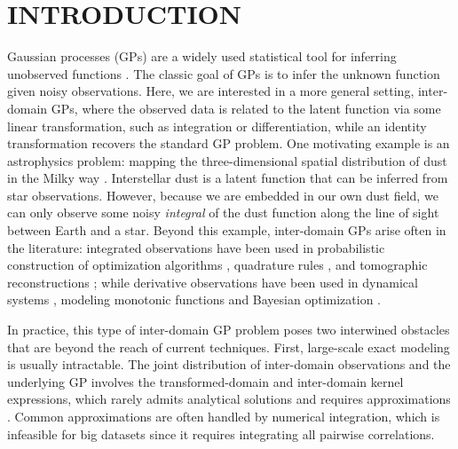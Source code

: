 \section{INTRODUCTION}
\label{sec:intro}
Gaussian processes (GPs) are a widely used statistical tool for inferring
unobserved functions \citep{cressie1992statistics, cressie1990origins,
rasmussen2006gaussian}. The classic goal of GPs is to infer the
unknown function given noisy observations. Here, we are interested in a more
general setting, inter-domain GPs,
where the observed data is related to the latent function via some linear transformation,
such as integration or differentiation,
while an identity transformation recovers the standard GP problem.
One motivating example is an
astrophysics problem: mapping the three-dimensional spatial distribution of dust in the Milky way \citep{green2015three,
leike2019charting, kh2017inferring}.
Interstellar dust is a latent function that can be inferred from star observations. However, because we are embedded in our own dust field,
we can only observe some noisy \textit{integral} of the dust function along the line of sight between Earth and a star.
Beyond this example, inter-domain GPs arise often in the literature: integrated observations have been used in probabilistic construction of optimization algorithms \citep{wills2017construction}, quadrature rules \citep{minka2000deriving}, and tomographic reconstructions \citep{jidling2018probabilistic};
while derivative observations have been used in dynamical systems \citep{solak2003derivative}, %
modeling monotonic functions \citep{riihimaki2010gaussian} and Bayesian optimization \citep{garnett2010bayesian, siivola2018correcting}.

In practice, this type of inter-domain GP problem poses two interwined obstacles that are beyond the reach of current techniques.
First, large-scale exact modeling is usually intractable.
The joint distribution of inter-domain observations and the underlying GP involves 
the transformed-domain and inter-domain kernel expressions,
which rarely admits analytical solutions
and requires approximations \citep{lazaro2009inter, hendriks2018evaluating}.
Common approximations are often handled
by numerical integration, which is infeasible for big datasets since it requires
integrating all pairwise correlations.

